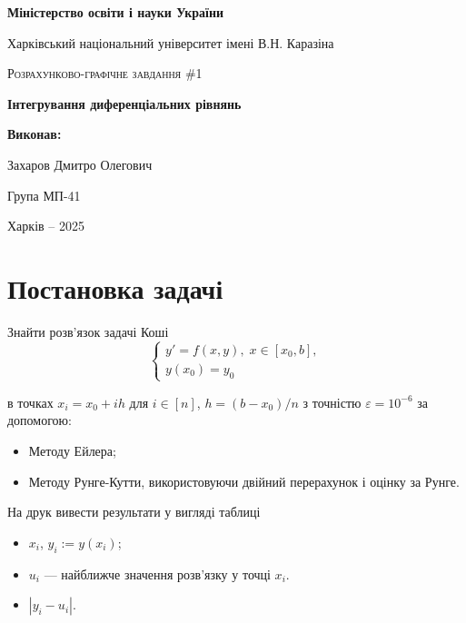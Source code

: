 \documentclass[14pt]{extarticle}
\begin{document}
\begin{titlepage}
	\centering
	{\textbf{Міністерство освіти і науки України}\par
 Харківський національний університет імені В.Н. Каразіна\par}
    \vspace{1cm}
	{\Large \textsc{Розрахунково-графічне завдання \#1}\par
    \textbf{Інтегрування диференціальних рівнянь}\par}
	\vfill
 \begin{FlushRight}
	\textbf{Виконав:}\par Захаров Дмитро Олегович \par Група МП-41
\end{FlushRight}
	\vfill

	{\large Харків -- 2025\par}
\end{titlepage}

\tableofcontents
\pagebreak

\section{Постановка задачі}

Знайти розв'язок задачі Коші
\begin{equation*}
    \begin{cases}
        y' = f(x,y), \; x \in [x_0,b], \\
        y(x_0) = y_0
    \end{cases}
\end{equation*}

в точках $x_i = x_0 + ih$ для $i \in [n]$, $h=(b-x_0)/n$ з точністю $\varepsilon
= 10^{-6}$ за допомогою:
\begin{itemize}
    \item Методу Ейлера;
    \item Методу Рунге-Кутти, використовуючи двійний перерахунок і оцінку за
    Рунге.
\end{itemize}

На друк вивести результати у вигляді таблиці
\begin{itemize}
    \item $x_i$, $y_i := y(x_i)$;
    \item $u_i$ --- найближче значення розв'язку у точці $x_i$.
    \item $|y_i - u_i|$.
\end{itemize}
\end{document}
